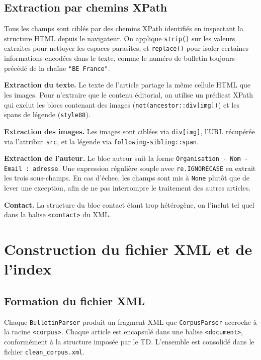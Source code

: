 \subsection{Extraction par chemins XPath}

Tous les champs sont ciblés par des chemins XPath identifiés en inspectant la structure HTML depuis le navigateur. On applique \texttt{strip()} sur les valeurs extraites pour nettoyer les espaces parasites, et \texttt{replace()} pour isoler certaines informations encodées dans le texte, comme le numéro de bulletin toujours précédé de la chaîne \texttt{"BE France"}.

\textbf{Extraction du texte.} Le texte de l'article partage la même cellule HTML que les images. Pour n'extraire que le contenu éditorial, on utilise un prédicat XPath qui exclut les blocs contenant des images (\texttt{not(ancestor::div[img])}) et les spans de légende (\texttt{style88}).

\textbf{Extraction des images.} Les images sont ciblées via \texttt{div[img]}, l'URL récupérée via l'attribut \texttt{src}, et la légende via \texttt{following-sibling::span}.

\textbf{Extraction de l'auteur.} Le bloc auteur suit la forme \texttt{Organisation - Nom - Email : adresse}. Une expression régulière souple avec \texttt{re.IGNORECASE} en extrait les trois sous-champs. En cas d'échec, les champs sont mis à \texttt{None} plutôt que de lever une exception, afin de ne pas interrompre le traitement des autres articles.

\textbf{Contact.} La structure du bloc contact étant trop hétérogène, on l'inclut tel quel dans la balise \texttt{<contact>} du XML.

\section{Construction du fichier XML et de l'index}

\subsection{Formation du fichier XML}

Chaque \texttt{BulletinParser} produit un fragment XML que \texttt{CorpusParser} accroche à la racine \texttt{<corpus>}. Chaque article est encapsulé dans une balise \texttt{<document>}, conformément à la structure imposée par le TD. L'ensemble est consolidé dans le fichier \texttt{clean\_corpus.xml}.

